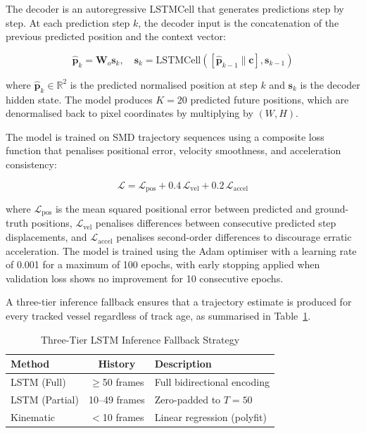 \documentclass{ieeeaccess}
\begin{document}
The decoder is an autoregressive LSTMCell that generates predictions 
step by step. At each prediction step $k$, the decoder input is the 
concatenation of the previous predicted position and the context vector:

\begin{equation}
\hat{\mathbf{p}}_k = \mathbf{W}_o \mathbf{s}_k, \quad
\mathbf{s}_k = \text{LSTMCell}([\hat{\mathbf{p}}_{k-1} \| \mathbf{c}],
\mathbf{s}_{k-1})
\end{equation}

where $\hat{\mathbf{p}}_k \in \mathbb{R}^2$ is the predicted normalised 
position at step $k$ and $\mathbf{s}_k$ is the decoder hidden state. 
The model produces $K = 20$ predicted future positions, which are 
denormalised back to pixel coordinates by multiplying by $(W, H)$.

The model is trained on SMD trajectory sequences using a composite 
loss function that penalises positional error, velocity smoothness, 
and acceleration consistency:

\begin{equation}
\mathcal{L} = \mathcal{L}_{\text{pos}} + 
0.4\,\mathcal{L}_{\text{vel}} + 0.2\,\mathcal{L}_{\text{accel}}
\end{equation}

where $\mathcal{L}_{\text{pos}}$ is the mean squared positional 
error between predicted and ground-truth positions, 
$\mathcal{L}_{\text{vel}}$ penalises differences between consecutive 
predicted step displacements, and $\mathcal{L}_{\text{accel}}$ 
penalises second-order differences to discourage erratic acceleration. 
The model is trained using the Adam optimiser with a learning rate 
of 0.001 for a maximum of 100 epochs, with early stopping applied 
when validation loss shows no improvement for 10 consecutive epochs.

A three-tier inference fallback ensures that a trajectory estimate 
is produced for every tracked vessel regardless of track age, 
as summarised in Table~\ref{tab:inference}.

\begin{table}[H]
\centering
\caption{Three-Tier LSTM Inference Fallback Strategy}
\label{tab:inference}
\begin{tabular}{|l|c|l|}
\hline
\cellcolor{gray!30}\textbf{Method} & 
\cellcolor{gray!30}\textbf{History} & 
\cellcolor{gray!30}\textbf{Description} \\
\hline
LSTM (Full)    & $\geq$50 frames & Full bidirectional encoding \\
LSTM (Partial) & 10--49 frames   & Zero-padded to $T=50$ \\
Kinematic      & $<$10 frames    & Linear regression (polyfit) \\
\hline
\end{tabular}
\end{table}
\end{document}
